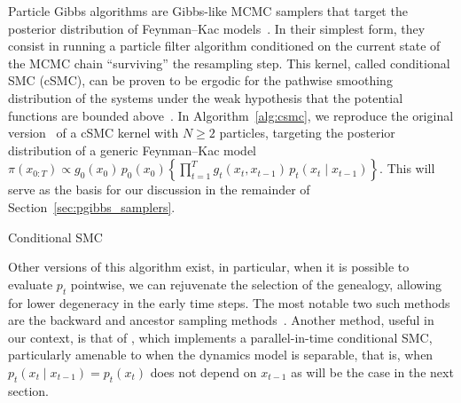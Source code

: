 Particle Gibbs algorithms are Gibbs-like MCMC samplers that target the posterior distribution of Feynman--Kac models~\citep{Andrieu2010particle,lindsten2012ancestor,lindsten2014particle}.
In their simplest form, they consist in running a particle filter algorithm conditioned on the current state of the MCMC chain ``surviving'' the resampling step. This kernel, called conditional SMC (cSMC), can be proven to be ergodic for the pathwise smoothing distribution of the systems under the weak hypothesis that the potential functions are bounded above~\citep[and references within]{lee2020coupled}. In Algorithm~\ref{alg:csmc}, we reproduce the original version~\citep{Andrieu2010particle} of a cSMC kernel with $N \geq 2$ particles, targeting the posterior distribution of a generic Feynman--Kac model $\pi(x_{0:T}) \propto g_0(x_0) \, p_0(x_0) \left\{\prod_{t=1}^T g_t(x_t, x_{t-1}) \, p_t(x_t \mid x_{t-1}) \right\}$. This will serve as the basis for our discussion in the remainder of Section~\ref{sec:pgibbs_samplers}.
\begin{algorithm}[!htb]
    \SetAlgoLined
    \DontPrintSemicolon
    \caption{Conditional SMC}\label{alg:csmc}
\end{algorithm}

Other versions of this algorithm exist, in particular, when it is possible to evaluate $p_t$ pointwise, we can rejuvenate the selection of the genealogy, allowing for lower degeneracy in the early time steps. The most notable two such methods are the backward and ancestor sampling methods~\citep[respectively]{whiteley2010discussion,lindsten2014particle}. Another method, useful in our context, is that of \citet[Section 3]{corenflos2022sequentialized}, which implements a parallel-in-time conditional SMC, particularly amenable to when the dynamics model is separable, that is, when $p_t(x_t \mid x_{t-1}) = p_t(x_t)$ does not depend on $x_{t-1}$ as will be the case in the next section.